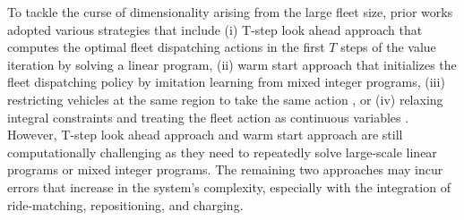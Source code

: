


To tackle the curse of dimensionality arising from the large fleet size, prior works adopted various strategies that include (i) T-step look ahead approach \citep{wei2023reinforcement} that computes the optimal fleet dispatching actions in the first $T$ steps of the value iteration by solving a linear program, (ii) warm start approach \citep{yuan2022reinforcement} that initializes the fleet dispatching policy by imitation learning from mixed integer programs, (iii) restricting vehicles at the same region to take the same action \citep{qin2021optimizing, liu2022deep}, or (iv) relaxing integral constraints and treating the fleet action as continuous variables \citep{mao2020dispatch, zhou2023robust, filipovska2022anticipatory, turan2020dynamic, gammelli2022graph, skordilis2021modular, schmidt2024learning, xie2023two, si2024vehicle}. However, T-step look ahead approach and warm start approach are still computationally challenging as they need to repeatedly solve large-scale linear programs or mixed integer programs. The remaining two approaches may incur errors that increase in the system's complexity, especially with the integration of ride-matching, repositioning, and charging.


